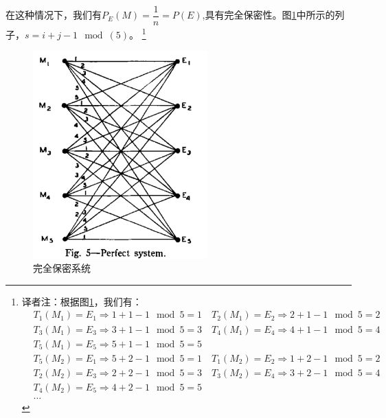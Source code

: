 \documentclass[]{article}
\begin{document}
在这种情况下，我们有$P_E(M)=\dfrac{1}{n}=P(E)$,具有完全保密性。图\ref{fig:perfect-sys}中所示的列子，$s=i+j-1 \mod(5)$。
\footnote{
	译者注：根据图\ref{fig:perfect-sys}，我们有：\\
	\begin{equation}\nonumber
		\begin{aligned}
			&T_1(M_1)=E_1\Rightarrow 1+1-1\mod{5}=1\quad T_2(M_1)=E_2\Rightarrow 2+1-1\mod{5}=2\\
			&T_3(M_1)=E_3\Rightarrow 3+1-1\mod{5}=3\quad T_4(M_1)=E_4\Rightarrow 4+1-1\mod{5}=4\\
			&T_5(M_1)=E_5\Rightarrow 5+1-1\mod{5}=5\\
			&T_5(M_2)=E_1\Rightarrow 5+2-1\mod{5}=1\quad T_1(M_2)=E_2\Rightarrow 1+2-1\mod{5}=2\\
			&T_2(M_2)=E_3\Rightarrow 2+2-1\mod{5}=3\quad T_3(M_2)=E_4\Rightarrow 3+2-1\mod{5}=4\\
			&T_4(M_2)=E_5\Rightarrow 4+2-1\mod{5}=5\\
			&\ldots
		\end{aligned}	
	\end{equation}
}

\begin{figure}[htbp]
	\centering
	\includegraphics[width=0.6\textwidth]{perfect-sys.png}
	\caption{完全保密系统}
	\label{fig:perfect-sys}
\end{figure}
\end{document}
